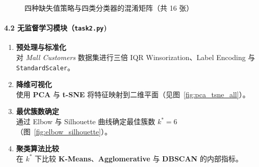 \documentclass[UTF8]{ctexart}
\begin{document}
\begin{figure}[htbp]
    \caption{四种缺失值策略与四类分类器的混淆矩阵（共 16 张）}
    \label{fig:all_confmats}
\end{figure}

\paragraph{4.2 无监督学习模块（\texttt{task2.py})}
\begin{enumerate}[label=\arabic*)]
    \item \textbf{预处理与标准化}\\
          对 \emph{Mall Customers} 数据集进行三倍 IQR Winsorization、Label Encoding 与 \texttt{StandardScaler}。
    \item \textbf{降维可视化}\\
          使用 \textbf{PCA} 与 \textbf{t-SNE} 将特征映射到二维平面（见图~\ref{fig:pca_tsne_all}）。
    \item \textbf{最优簇数确定}\\
          通过 Elbow 与 Silhouette 曲线确定最佳簇数 \(k^\ast=6\)（图~\ref{fig:elbow_silhouette}）。
    \item \textbf{聚类算法比较}\\
          在 \(k^\ast\) 下比较 \textbf{K-Means}、\textbf{Agglomerative} 与 \textbf{DBSCAN} 的内部指标。
\end{enumerate}
\end{document}
